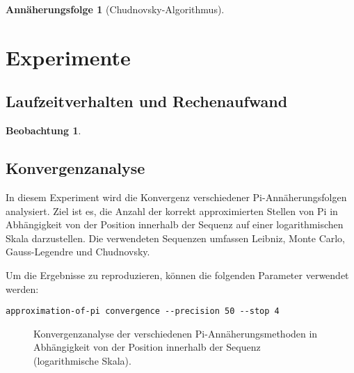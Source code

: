 \documentclass{scrartcl}
\theoremstyle{definition}
\newtheorem{approximation sequence}{Annäherungsfolge}
\newtheorem{observation}{Beobachtung}
\begin{document}
\begin{approximation sequence}[Chudnovsky-Algorithmus]

\end{approximation sequence}

\section{Experimente}

\subsection{Laufzeitverhalten und Rechenaufwand}

\begin{observation}

\end{observation}

\subsection{Konvergenzanalyse}

In diesem Experiment wird die Konvergenz verschiedener Pi-Annäherungsfolgen
analysiert. Ziel ist es, die Anzahl der korrekt approximierten Stellen von Pi
in Abhängigkeit von der Position innerhalb der Sequenz auf einer
logarithmischen Skala darzustellen. Die verwendeten Sequenzen umfassen Leibniz,
Monte Carlo, Gauss-Legendre und Chudnovsky.

Um die Ergebnisse zu reproduzieren, können die folgenden Parameter verwendet
werden:
\begin{verbatim}
approximation-of-pi convergence --precision 50 --stop 4
\end{verbatim}

\begin{figure}[H]
    \centering
    
    \caption{Konvergenzanalyse der verschiedenen Pi-Annäherungsmethoden in Abhängigkeit von der Position innerhalb der Sequenz (logarithmische Skala).}
    \label{fig:convergence-analysis}
\end{figure}
\end{document}
